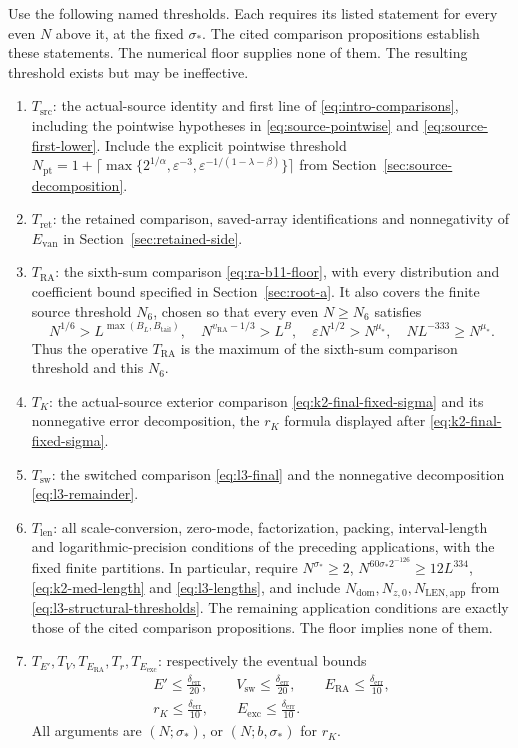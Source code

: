 Use the following named thresholds. Each requires its listed statement
for every even $N$ above it, at the fixed $\sigma_*$. The cited comparison
propositions establish these statements. The numerical floor supplies none
of them. The resulting threshold exists but may be ineffective.
\begin{enumerate}
\item $T_{\mathrm{src}}$: the actual-source identity and first line of
\eqref{eq:intro-comparisons}, including the pointwise hypotheses in
\eqref{eq:source-pointwise} and \eqref{eq:source-first-lower}.
Include the explicit pointwise threshold
$N_{\mathrm{pt}}=1+\lceil\max\{2^{1/\alpha},\varepsilon^{-3},
\varepsilon^{-1/(1-\lambda-\beta)}\}\rceil$ from
Section~\ref{sec:source-decomposition}.
\item $T_{\mathrm{ret}}$: the retained comparison, saved-array
identifications and nonnegativity of $E_{\mathrm{van}}$ in
Section~\ref{sec:retained-side}.
\item $T_{\mathrm{RA}}$: the sixth-sum comparison
\eqref{eq:ra-b11-floor}, with every distribution and coefficient bound
specified in Section~\ref{sec:root-a}. It also covers the finite source
threshold $N_6$, chosen so that every even $N\ge N_6$ satisfies
\[
 N^{1/6}>L^{\max(B_L,B_{\mathrm{tail}})},\quad
 N^{v_{\mathrm{RA}}-1/3}>L^B,\quad
 \varepsilon N^{1/2}>N^{\mu_*},\quad
 NL^{-333}\ge N^{\mu_*}.
\]
Thus the operative $T_{\mathrm{RA}}$ is the maximum of the sixth-sum
comparison threshold and this $N_6$.
\item $T_K$: the actual-source exterior comparison
\eqref{eq:k2-final-fixed-sigma} and its nonnegative error decomposition,
the $r_K$ formula displayed after
\eqref{eq:k2-final-fixed-sigma}.
\item $T_{\mathrm{sw}}$: the switched comparison \eqref{eq:l3-final}
and the nonnegative decomposition \eqref{eq:l3-remainder}.
\item $T_{\mathrm{len}}$: all scale-conversion, zero-mode, factorization,
packing, interval-length and logarithmic-precision conditions of the
preceding applications, with the fixed finite partitions. In particular,
require $N^{\sigma_*}\ge2$,
$N^{60\sigma_*2^{-126}}\ge12L^{334}$,
\eqref{eq:k2-med-length} and \eqref{eq:l3-lengths}, and include
$N_{\mathrm{dom}},N_{z,0},N_{\mathrm{LEN,app}}$ from
\eqref{eq:l3-structural-thresholds}. The remaining application conditions
are exactly those of the cited comparison propositions. The floor implies
none of them.
\item $T_{E'},T_V,T_{E_{\mathrm{RA}}},T_r,T_{E_{\mathrm{exc}}}$:
respectively the eventual bounds
\[
\begin{gathered}
 E'\le\frac{\delta_{\mathrm{err}}}{20},\qquad
 V_{\mathrm{sw}}\le\frac{\delta_{\mathrm{err}}}{20},\qquad
 E_{\mathrm{RA}}\le\frac{\delta_{\mathrm{err}}}{10},\\
 r_K\le\frac{\delta_{\mathrm{err}}}{10},\qquad
 E_{\mathrm{exc}}\le\frac{\delta_{\mathrm{err}}}{10}.
\end{gathered}
\]
All arguments are $(N;\sigma_*)$, or $(N;b,\sigma_*)$ for $r_K$.
\end{enumerate}
